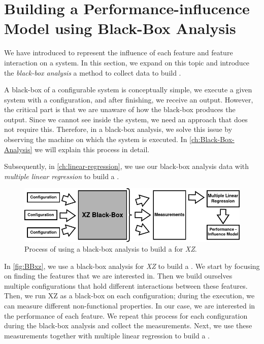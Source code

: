 \section{Building a Performance-influcence Model using Black-Box Analysis}\label{ch:Blackbox}

We have introduced {\perfInfluenceModel} to represent the influence of each feature and feature interaction on a system. In this section, 
we expand on this topic and introduce the \emph{black-box analysis} a method to collect data to build \perfInfluenceModel.

A black-box of a configurable system is conceptually simple, we execute a given system with a configuration, and after finishing, we receive an output. 
However, the critical part is that we are unaware of how the black-box produces the output. 
Since we cannot see inside the system, we need an approach that does not require this. 
Therefore, in a black-box analysis, we solve this issue by observing the machine on which the system is executed.
In \autoref{ch:Black-Box-Analysis} we will explain this process in detail.

Subsequently, in \autoref{ch:linear-regression}, we use our black-box analysis data with \emph{multiple linear regression} to build a \perfInfluenceModel. 

\begin{figure}[h]
    \centering
    \includegraphics[scale=0.55]{gfx/BlackBox2_0.png}
    \caption{Process of using a black-box analysis to build a \perfInfluenceModel for \textit{XZ}.}
    \label{fig:BBxz}
\end{figure}

In \autoref{fig:BBxz}, we use a black-box analysis for \textit{XZ} to build a \perfInfluenceModel.
We start by focusing on finding the features that we are interested in. 
Then we build ourselves multiple configurations that hold different interactions between these features.
Then, we run XZ as a black-box on each configuration; during the execution, we can measure different non-functional properties.
In our case, we are interested in the performance of each feature. 
We repeat this process for each configuration during the black-box analysis and collect the measurements.
Next, we use these measurements together with multiple linear regression to build a \perfInfluenceModel.

